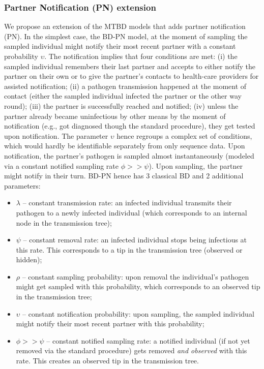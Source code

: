 \documentclass[10pt,letterpaper]{article}
\begin{document}
\subsubsection*{Partner Notification (PN) extension}

We propose an %
extension of the MTBD models that adds partner notification (PN).  In the simplest case, the BD-PN model, at the moment of sampling the sampled individual might notify their most recent partner with a constant probability $\upsilon$. The notification implies that four conditions are met: (i) the sampled individual remembers their last partner and accepts to either notify the partner on their own or to give the partner's contacts to health-care providers for assisted notification; (ii) a pathogen transmission happened at the moment of contact (either the sampled individual infected the partner or the other way round); (iii) the partner is successfully reached and notified; (iv) unless the partner already became uninfectious by other means by the moment of notification (e.g., got diagnosed though the standard procedure), they get tested upon notification. The parameter $\upsilon$ hence regroups a complex set of conditions, which would hardly be identifiable separately from only sequence data. Upon notification, the partner's pathogen is sampled almost instantaneously (modeled via a constant notified sampling rate $\phi >> \psi$). Upon sampling, the partner might notify in their turn. BD-PN hence has 3 classical BD and 2 additional parameters:
\begin{itemize}
 \item $\lambda$ -- constant transmission rate: an infected individual transmits their pathogen to a newly infected individual (which corresponds to an internal node in the transmission tree);
 \item $\psi$ -- constant removal rate: an infected individual stops being infectious at this rate. This corresponds to a tip in the transmission tree (observed or hidden);
 \item $\rho$ -- constant sampling probability: upon removal the individual's pathogen might get sampled with this probability, which corresponds to an observed tip in the transmission tree;
 \item $\upsilon$ -- constant notification probability: upon sampling, the sampled individual might notify their most recent partner with this probability;
 \item $\phi >> \psi$ -- constant notified sampling rate: a notified individual (if not yet removed via the standard procedure) gets removed \textit{and observed} with this rate. This creates an observed tip in the transmission tree. 
\end{itemize}
\end{document}
